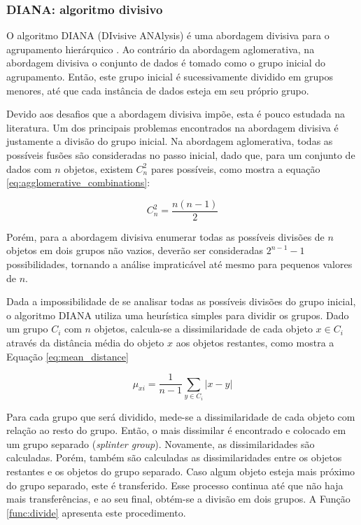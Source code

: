 \subsubsection{DIANA: algoritmo divisivo}
	\label{subsec:diana}

O algoritmo DIANA (DIvisive ANAlysis) é uma abordagem divisiva para o
agrupamento hierárquico \cite{kaufman1990finding}. Ao contrário da abordagem
aglomerativa, na abordagem divisiva o conjunto de dados é tomado como o grupo
inicial do agrupamento. Então, este grupo inicial é sucessivamente dividido em
grupos menores, até que cada instância de dados esteja em seu próprio grupo.

Devido aos desafios que a abordagem divisiva impõe, esta é pouco estudada na
literatura. Um dos principais problemas encontrados na abordagem divisiva é
justamente a divisão do grupo inicial. Na abordagem aglomerativa, todas as
possíveis fusões são consideradas no passo inicial, dado que, para um conjunto
de dados com $n$ objetos, existem $C_{n}^{2}$ pares possíveis, como mostra a
equação \ref{eq:agglomerative_combinations}:

\begin{equation}
	C_n^2 = \frac{n \left(n-1\right)}{2}
	\label{eq:agglomerative_combinations}
\end{equation}

Porém, para a abordagem divisiva enumerar todas as possíveis divisões de $n$
objetos em dois grupos não vazios, deverão ser consideradas $2^{n-1} - 1$
possibilidades, tornando a análise impraticável até mesmo para pequenos valores
de $n$.

Dada a impossibilidade de se analisar todas as possíveis divisões do grupo
inicial, o algoritmo DIANA utiliza uma heurística simples para dividir os
grupos. Dado um grupo $C_i$ com $n$ objetos, calcula-se a dissimilaridade de
cada objeto $x \in C_i$ através da distância média do objeto $x$ aos objetos
restantes, como mostra a Equação \ref{eq:mean_distance}

\begin{equation}
	\mu_{xi} = \frac{1}{n-1} \sum_{y \in C_i }{\left| x - y \right|}
	\label{eq:mean_distance}
\end{equation}

Para cada grupo que será dividido, mede-se a dissimilaridade de cada
objeto com relação ao resto do grupo. Então, o mais dissimilar é encontrado
e colocado em um grupo separado (\emph{splinter group}). Novamente, as
dissimilaridades são calculadas. Porém, também são calculadas as
dissimilaridades entre os objetos restantes e os objetos do grupo separado. Caso
algum objeto esteja mais próximo do grupo separado, este é transferido. Esse
processo continua até que não haja mais transferências, e ao seu final, obtém-se
a divisão em dois grupos. A Função \ref{func:divide} apresenta este procedimento.

